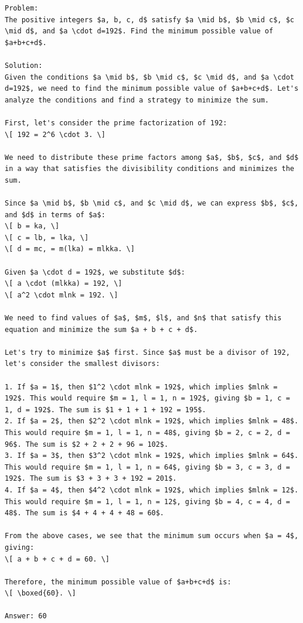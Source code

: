 \documentclass[11pt]{article}
\begin{document}
\begin{Verbatim}[breaklines=true,breakanywhere=true,fontsize=\small]
Problem:
The positive integers $a, b, c, d$ satisfy $a \mid b$, $b \mid c$, $c \mid d$, and $a \cdot d=192$. Find the minimum possible value of $a+b+c+d$.

Solution:
Given the conditions $a \mid b$, $b \mid c$, $c \mid d$, and $a \cdot d=192$, we need to find the minimum possible value of $a+b+c+d$. Let's analyze the conditions and find a strategy to minimize the sum.

First, let's consider the prime factorization of 192:
\[ 192 = 2^6 \cdot 3. \]

We need to distribute these prime factors among $a$, $b$, $c$, and $d$ in a way that satisfies the divisibility conditions and minimizes the sum.

Since $a \mid b$, $b \mid c$, and $c \mid d$, we can express $b$, $c$, and $d$ in terms of $a$:
\[ b = ka, \]
\[ c = lb, = lka, \]
\[ d = mc, = m(lka) = mlkka. \]

Given $a \cdot d = 192$, we substitute $d$:
\[ a \cdot (mlkka) = 192, \]
\[ a^2 \cdot mlnk = 192. \]

We need to find values of $a$, $m$, $l$, and $n$ that satisfy this equation and minimize the sum $a + b + c + d$.

Let's try to minimize $a$ first. Since $a$ must be a divisor of 192, let's consider the smallest divisors:

1. If $a = 1$, then $1^2 \cdot mlnk = 192$, which implies $mlnk = 192$. This would require $m = 1, l = 1, n = 192$, giving $b = 1, c = 1, d = 192$. The sum is $1 + 1 + 1 + 192 = 195$.
2. If $a = 2$, then $2^2 \cdot mlnk = 192$, which implies $mlnk = 48$. This would require $m = 1, l = 1, n = 48$, giving $b = 2, c = 2, d = 96$. The sum is $2 + 2 + 2 + 96 = 102$.
3. If $a = 3$, then $3^2 \cdot mlnk = 192$, which implies $mlnk = 64$. This would require $m = 1, l = 1, n = 64$, giving $b = 3, c = 3, d = 192$. The sum is $3 + 3 + 3 + 192 = 201$.
4. If $a = 4$, then $4^2 \cdot mlnk = 192$, which implies $mlnk = 12$. This would require $m = 1, l = 1, n = 12$, giving $b = 4, c = 4, d = 48$. The sum is $4 + 4 + 4 + 48 = 60$.

From the above cases, we see that the minimum sum occurs when $a = 4$, giving:
\[ a + b + c + d = 60. \]

Therefore, the minimum possible value of $a+b+c+d$ is:
\[ \boxed{60}. \]

Answer: 60
\end{Verbatim}
\clearpage
\end{document}
